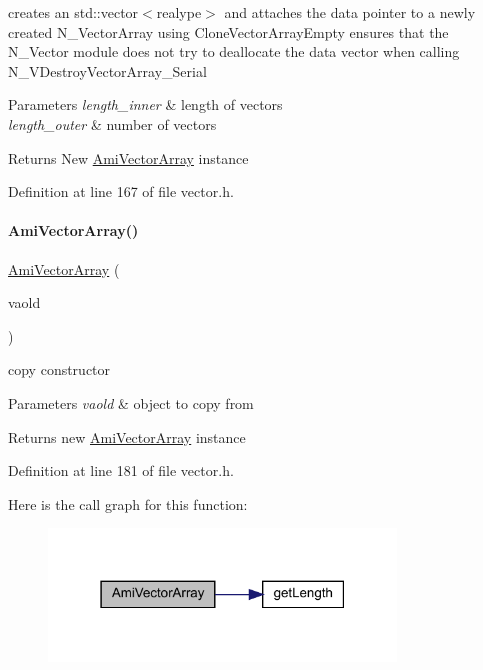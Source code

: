 creates an std\+::vector$<$realype$>$ and attaches the data pointer to a newly created N\+\_\+\+Vector\+Array using Clone\+Vector\+Array\+Empty ensures that the N\+\_\+\+Vector module does not try to deallocate the data vector when calling N\+\_\+\+V\+Destroy\+Vector\+Array\+\_\+\+Serial 
\begin{DoxyParams}{Parameters}
{\em length\+\_\+inner} & length of vectors \\
\hline
{\em length\+\_\+outer} & number of vectors \\
\hline
\end{DoxyParams}
\begin{DoxyReturn}{Returns}
New \mbox{\hyperlink{classamici_1_1_ami_vector_array}{Ami\+Vector\+Array}} instance 
\end{DoxyReturn}


Definition at line 167 of file vector.\+h.

\mbox{\label{classamici_1_1_ami_vector_array_a3b40abc4d3e4fc0a097834dd56666f41}} 
\paragraph{\texorpdfstring{AmiVectorArray()}{AmiVectorArray()}\hspace{0.1cm}{\footnotesize\ttfamily [2/2]}}
{\footnotesize\ttfamily \mbox{\hyperlink{classamici_1_1_ami_vector_array}{Ami\+Vector\+Array}} (\begin{DoxyParamCaption}\item[{const \mbox{\hyperlink{classamici_1_1_ami_vector_array}{Ami\+Vector\+Array}} \&}]{vaold }\end{DoxyParamCaption})}

copy constructor 
\begin{DoxyParams}{Parameters}
{\em vaold} & object to copy from \\
\hline
\end{DoxyParams}
\begin{DoxyReturn}{Returns}
new \mbox{\hyperlink{classamici_1_1_ami_vector_array}{Ami\+Vector\+Array}} instance 
\end{DoxyReturn}


Definition at line 181 of file vector.\+h.

Here is the call graph for this function\+:
\nopagebreak
\begin{figure}[H]
\begin{center}
\leavevmode
\includegraphics[width=262pt]{classamici_1_1_ami_vector_array_a3b40abc4d3e4fc0a097834dd56666f41_cgraph}
\end{center}
\end{figure}


